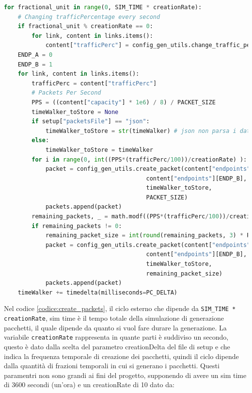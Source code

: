 \documentclass[binding=0.6cm]{sapthesis}
\begin{document}
{\scriptsize
\begin{lstlisting}[language=Python, basicstyle=\ttfamily, caption={logica creazione pacchetti}, label={codice:create_packets}, breaklines=true]
for fractional_unit in range(0, SIM_TIME * creationRate):
    # Changing trafficPercentage every second
    if fractional_unit % creationRate == 0:
        for link, content in links.items():
            content["trafficPerc"] = config_gen_utils.change_traffic_perc(content["trafficPerc"], setup["trafficVariation"])
    ENDP_A = 0
    ENDP_B = 1
    for link, content in links.items():
        trafficPerc = content["trafficPerc"]
        # Packets Per Second
        PPS = ((content["capacity"] * 1e6) / 8) / PACKET_SIZE
        timeWalker_toStore = None
        if setup["packetsFile"] == "json":
            timeWalker_toStore = str(timeWalker) # json non parsa i datetime!
        else:
            timeWalker_toStore = timeWalker
        for i in range(0, int((PPS*(trafficPerc/100))/creationRate) ):
            packet = config_gen_utils.create_packet(content["endpoints"][ENDP_A],
                                         content["endpoints"][ENDP_B],
                                         timeWalker_toStore,
                                         PACKET_SIZE)
            packets.append(packet)
        remaining_packets, _ = math.modf((PPS*(trafficPerc/100))/creationRate)
        if remaining_packets != 0:
            remaining_packet_size = int(round(remaining_packets, 3) * PACKET_SIZE)
            packet = config_gen_utils.create_packet(content["endpoints"][ENDP_A],
                                         content["endpoints"][ENDP_B],
                                         timeWalker_toStore,
                                         remaining_packet_size)
            packets.append(packet)
    timeWalker += timedelta(milliseconds=PC_DELTA)
\end{lstlisting}
}

Nel codice \ref{codice:create_packets}, il ciclo esterno che dipende da \lstinline|SIM_TIME * creationRate|, sim time è il tempo totale della simulazione di generazione pacchetti, 
il quale dipende da quanto si vuol fare durare la generazione. La variabile \lstinline|creationRate| rappresenta in quante parti è suddiviso un secondo, questo è dato
dalla scelta del parametro creationDelta del file di setup e che indica la frequenza temporale di creazione dei pacchetti, quindi il ciclo dipende dalla quantità di frazioni temporali in cui si generano i pacchetti.
Questi paramentri non sono grandi ai fini del progetto, supponendo di avere un sim time di 3600 secondi (un'ora) e un creationRate di 10 dato da: 
\end{document}
